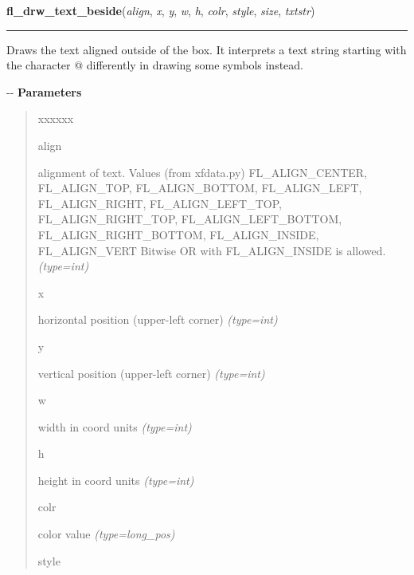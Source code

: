 \hspace{.8\funcindent}\begin{boxedminipage}{\funcwidth}

    \raggedright \textbf{fl\_drw\_text\_beside}(\textit{align}, \textit{x}, \textit{y}, \textit{w}, \textit{h}, \textit{colr}, \textit{style}, \textit{size}, \textit{txtstr})

    \vspace{-1.5ex}

    \rule{\textwidth}{0.5\fboxrule}
\setlength{\parskip}{2ex}

Draws the text aligned outside of the box. It interprets a text string
starting with the character @ differently in drawing some symbols instead.

-{}-
\setlength{\parskip}{1ex}
      \textbf{Parameters}
      \vspace{-1ex}

      \begin{quote}
        \begin{Ventry}{xxxxxx}

          \item[align]


alignment of text. Values (from xfdata.py) FL\_ALIGN\_CENTER,
FL\_ALIGN\_TOP, FL\_ALIGN\_BOTTOM, FL\_ALIGN\_LEFT, FL\_ALIGN\_RIGHT,
FL\_ALIGN\_LEFT\_TOP, FL\_ALIGN\_RIGHT\_TOP, FL\_ALIGN\_LEFT\_BOTTOM,
FL\_ALIGN\_RIGHT\_BOTTOM, FL\_ALIGN\_INSIDE, FL\_ALIGN\_VERT
Bitwise OR with FL\_ALIGN\_INSIDE is allowed.
            {\it (type=int)}

          \item[x]


horizontal position (upper-left corner)
            {\it (type=int)}

          \item[y]


vertical position (upper-left corner)
            {\it (type=int)}

          \item[w]


width in coord units
            {\it (type=int)}

          \item[h]


height in coord units
            {\it (type=int)}

          \item[colr]


color value
            {\it (type=long\_pos)}

          \item[style]



\end{Ventry}
\end{quote}
\end{boxedminipage}
